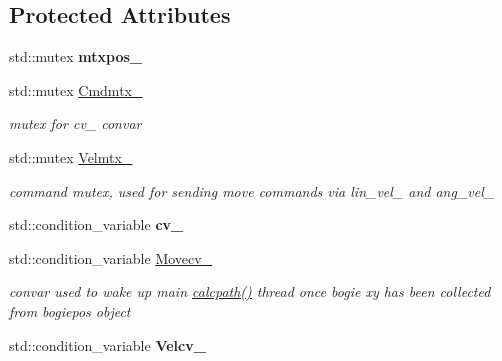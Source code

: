 \subsection*{Protected Attributes}
\begin{DoxyCompactItemize}
\item 
\mbox{\label{classControl_a603378c110983f3c855df10bfe525c8e}} 
std\+::mutex {\bfseries mtxpos\+\_\+}
\item 
\mbox{\label{classControl_aab035f20a9ed6ef18761e9fad3403b79}} 
std\+::mutex \hyperlink{classControl_aab035f20a9ed6ef18761e9fad3403b79}{Cmdmtx\+\_\+}
\begin{DoxyCompactList}\small\item\em mutex for cv\+\_\+ convar \end{DoxyCompactList}\item 
\mbox{\label{classControl_a2e77b6aaf947cb52490bb0ae6fbbc404}} 
std\+::mutex \hyperlink{classControl_a2e77b6aaf947cb52490bb0ae6fbbc404}{Velmtx\+\_\+}
\begin{DoxyCompactList}\small\item\em command mutex, used for sending move commands via lin\+\_\+vel\+\_\+ and ang\+\_\+vel\+\_\+ \end{DoxyCompactList}\item 
\mbox{\label{classControl_aec807365dbda609b3d3df8f8e9a3b565}} 
std\+::condition\+\_\+variable {\bfseries cv\+\_\+}
\item 
\mbox{\label{classControl_aa8fb0e7eb4a78e85d07cecb3c95d47f9}} 
std\+::condition\+\_\+variable \hyperlink{classControl_aa8fb0e7eb4a78e85d07cecb3c95d47f9}{Movecv\+\_\+}
\begin{DoxyCompactList}\small\item\em convar used to wake up main \hyperlink{classControl_a9bfe498567206c176b0e23d71708d6e3}{calcpath()} thread once bogie xy has been collected from bogiepos object \end{DoxyCompactList}\item 
\mbox{\label{classControl_a786552cb46cde87e5d8aac8da769df8f}} 
std\+::condition\+\_\+variable {\bfseries Velcv\+\_\+}
\item 
\mbox{\label{classControl_afe4abd7bbf2c1a1d21ffa037ddf8ee82}} 

\end{DoxyCompactItemize}
